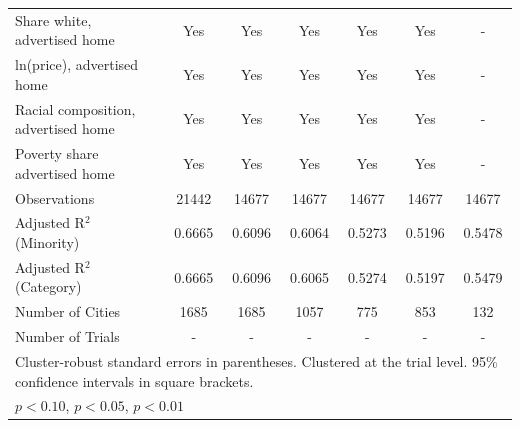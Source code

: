 \begin{table}[htbp]
{\begin{tabular}{l*{6}{c}}
\midrule
Share white, advertised home  & Yes & Yes & Yes & Yes & Yes & - \\
ln(price), advertised home  & Yes & Yes & Yes & Yes & Yes & - \\
Racial composition, advertised home & Yes & Yes & Yes & Yes & Yes & - \\
Poverty share advertised home & Yes & Yes & Yes & Yes & Yes & - \\
Observations & 21442 & 14677 & 14677 & 14677 & 14677 & 14677 \\
Adjusted R$^2$ (Minority) & 0.6665 & 0.6096 & 0.6064 & 0.5273 & 0.5196 & 0.5478 \\
Adjusted R$^2$ (Category) & 0.6665 & 0.6096 & 0.6065 & 0.5274 & 0.5197 & 0.5479 \\
Number of Cities & 1685 & 1685 & 1057 & 775 & 853 & 132 \\
Number of Trials & - & - & - & - & - & - \\
\bottomrule
\multicolumn{7}{l}{\footnotesize Cluster-robust standard errors in parentheses. Clustered at the trial level. 95\% confidence intervals in square brackets.}\\
\multicolumn{7}{l}{\footnotesize \sym{*} \(p<0.10\), \sym{**} \(p<0.05\), \sym{***} \(p<0.01\)}\\
\end{tabular}
}
\end{table}
